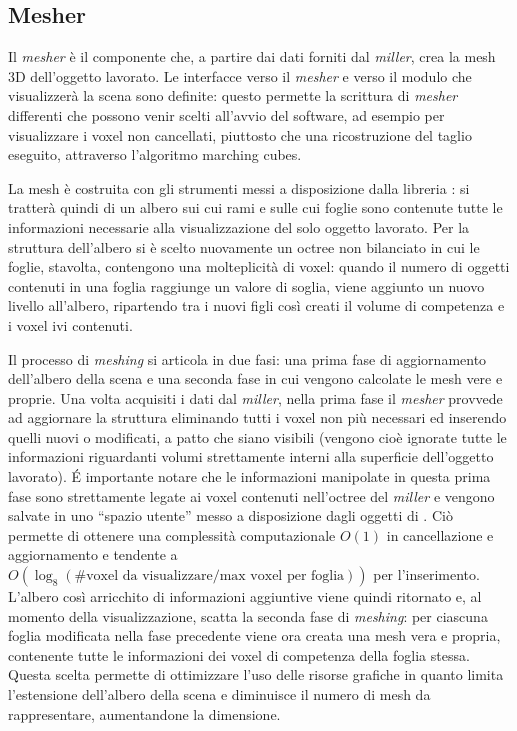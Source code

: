 \subsection{Mesher}
\label{sec:modules_mesher}
Il \emph{mesher} è il componente che, a partire dai dati forniti dal \emph{miller}, crea la mesh 3D dell'oggetto lavorato. Le interfacce verso il \emph{mesher} e verso il modulo che visualizzerà la scena sono definite: questo permette la scrittura di \emph{mesher} differenti che possono venir scelti all'avvio del software, ad esempio per visualizzare i voxel non cancellati, piuttosto che una ricostruzione del taglio eseguito, attraverso l'algoritmo marching cubes.

La mesh è costruita con gli strumenti messi a disposizione dalla libreria \osg: si tratterà quindi di un albero sui cui rami e sulle cui foglie sono contenute tutte le informazioni necessarie alla visualizzazione del solo oggetto lavorato. Per la struttura dell'albero si è scelto nuovamente un octree non bilanciato in cui le foglie, stavolta, contengono una molteplicità di voxel: quando il numero di oggetti contenuti in una foglia raggiunge un valore di soglia, viene aggiunto un nuovo livello all'albero, ripartendo tra i nuovi figli così creati il volume di competenza e i voxel ivi contenuti.

Il processo di \emph{meshing} si articola in due fasi: una prima fase di aggiornamento dell'albero della scena e una seconda fase in cui vengono calcolate le mesh vere e proprie. Una volta acquisiti i dati dal \emph{miller}, nella prima fase il \emph{mesher} provvede ad aggiornare la struttura eliminando tutti i voxel non più necessari ed inserendo quelli nuovi o modificati, a patto che siano visibili (vengono cioè ignorate tutte le informazioni riguardanti volumi strettamente interni alla superficie dell'oggetto lavorato). \'E importante notare che le informazioni manipolate in questa prima fase sono strettamente legate ai voxel contenuti nell'octree del \emph{miller} e vengono salvate in uno ``spazio utente'' messo a disposizione dagli oggetti di \osg. Ciò permette di ottenere una complessità computazionale $O(1)$ in cancellazione e aggiornamento e tendente a $O(\log_{8}(\text{\# voxel da visualizzare}/\text{max voxel per foglia}))$ per l'inserimento. L'albero così arricchito di informazioni aggiuntive viene quindi ritornato e, al momento della visualizzazione, scatta la seconda fase di \emph{meshing}: per ciascuna foglia modificata nella fase precedente viene ora creata una mesh vera e propria, contenente tutte le informazioni dei voxel di competenza della foglia stessa. Questa scelta permette di ottimizzare l'uso delle risorse grafiche in quanto limita l'estensione dell'albero della scena e diminuisce il numero di mesh da rappresentare, aumentandone la dimensione.


